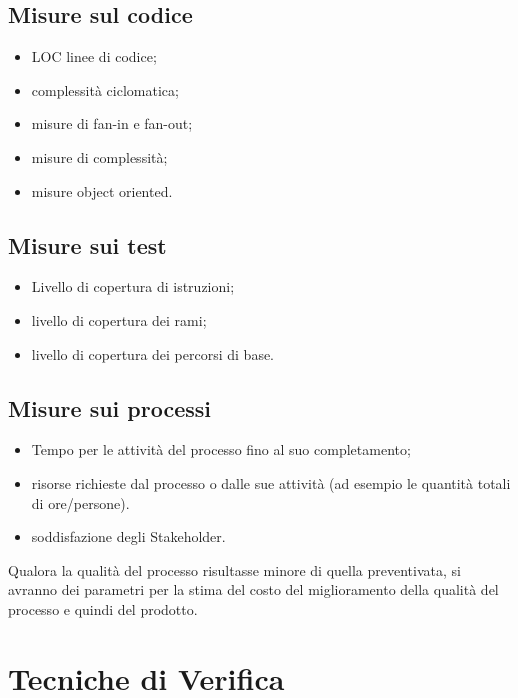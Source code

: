 \subsection{Misure sul codice}

\begin{itemize}
  
\item LOC linee di codice;
\item complessit\`a ciclomatica;
\item misure di fan-in e fan-out;
\item misure di complessit\`a;
\item misure object oriented.

\end{itemize}


\subsection{Misure sui test}

\begin{itemize}
  
\item Livello di copertura di istruzioni;
\item livello di copertura dei rami;
\item livello di copertura dei percorsi di base.
\end{itemize}



  
\subsection{Misure sui processi} 

\begin{itemize} 
\item Tempo per le attivit\`a del processo fino al suo completamento;
\item risorse richieste dal processo o dalle sue attivit\`a (ad esempio le
quantit\`a totali di ore/persone).
\item soddisfazione degli Stakeholder.  
\end{itemize}

Qualora la qualit\`a del processo risultasse minore di quella preventivata,
si avranno dei parametri per la stima del costo del miglioramento della qualit\`a
del processo e quindi del prodotto.



\section{Tecniche di Verifica}

